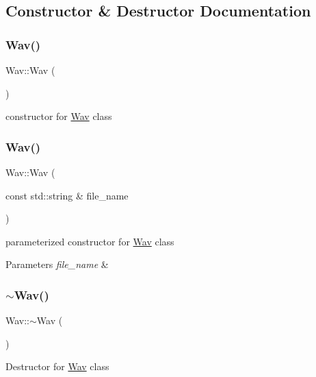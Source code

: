 \subsection{Constructor \& Destructor Documentation}
\mbox{\label{classWav_abe9848ac7af353c82a78f00a600c18e6}} 
\subsubsection{\texorpdfstring{Wav()}{Wav()}\hspace{0.1cm}{\footnotesize\ttfamily [1/2]}}
{\footnotesize\ttfamily Wav\+::\+Wav (\begin{DoxyParamCaption}{ }\end{DoxyParamCaption})}

constructor for \hyperlink{classWav}{Wav} class \mbox{\label{classWav_abaf926eed5e8b8cb1952956ca51b8c77}} 
\subsubsection{\texorpdfstring{Wav()}{Wav()}\hspace{0.1cm}{\footnotesize\ttfamily [2/2]}}
{\footnotesize\ttfamily Wav\+::\+Wav (\begin{DoxyParamCaption}\item[{const std\+::string \&}]{file\+\_\+name }\end{DoxyParamCaption})}

parameterized constructor for \hyperlink{classWav}{Wav} class 
\begin{DoxyParams}{Parameters}
{\em file\+\_\+name} & \\
\hline
\end{DoxyParams}
\mbox{\label{classWav_a1510b246ba121b103a60b8e7839af25f}} 
\subsubsection{\texorpdfstring{$\sim$\+Wav()}{~Wav()}}
{\footnotesize\ttfamily Wav\+::$\sim$\+Wav (\begin{DoxyParamCaption}{ }\end{DoxyParamCaption})}

Destructor for \hyperlink{classWav}{Wav} class 

